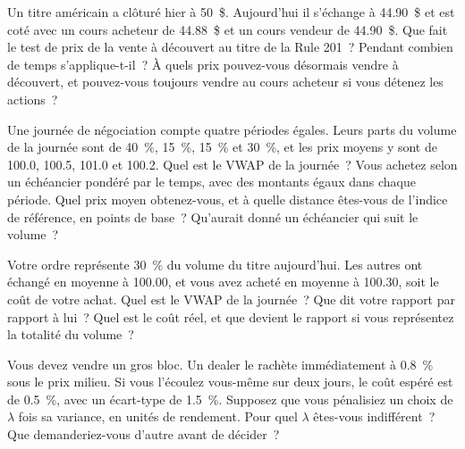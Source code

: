 \begin{question}\label{iq:iv2:markets-and-microstructure:22}
Un titre américain a clôturé hier à 50~\$. Aujourd'hui il s'échange à 44.90~\$ et est coté avec un cours acheteur de 44.88~\$ et un cours vendeur de 44.90~\$. Que fait le test de prix de la vente à découvert au titre de la Rule 201~? Pendant combien de temps s'applique-t-il~? À quels prix pouvez-vous désormais vendre à découvert, et pouvez-vous toujours vendre au cours acheteur si vous détenez les actions~?
\end{question}

\begin{question}\label{iq:iv2:markets-and-microstructure:23}
Une journée de négociation compte quatre périodes égales. Leurs parts du volume de la journée sont de 40~\%, 15~\%, 15~\% et 30~\%, et les prix moyens y sont de 100.0, 100.5, 101.0 et 100.2. Quel est le VWAP de la journée~? Vous achetez selon un échéancier pondéré par le temps, avec des montants égaux dans chaque période. Quel prix moyen obtenez-vous, et à quelle distance êtes-vous de l'indice de référence, en points de base~? Qu'aurait donné un échéancier qui suit le volume~?
\end{question}

\begin{question}\label{iq:iv2:markets-and-microstructure:24}
Votre ordre représente 30~\% du volume du titre aujourd'hui. Les autres ont échangé en moyenne à 100.00, et vous avez acheté en moyenne à 100.30, soit le coût de votre achat. Quel est le VWAP de la journée~? Que dit votre rapport par rapport à lui~? Quel est le coût réel, et que devient le rapport si vous représentez la totalité du volume~?
\end{question}

\begin{question}\label{iq:iv2:markets-and-microstructure:25}
Vous devez vendre un gros bloc. Un dealer le rachète immédiatement à 0.8~\% sous le prix milieu. Si vous l'écoulez vous-même sur deux jours, le coût espéré est de 0.5~\%, avec un écart-type de 1.5~\%. Supposez que vous pénalisiez un choix de $\lambda$ fois sa variance, en unités de rendement. Pour quel $\lambda$ êtes-vous indifférent~? Que demanderiez-vous d'autre avant de décider~?
\end{question}

